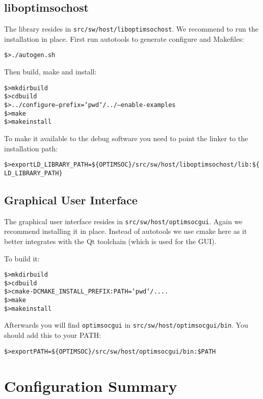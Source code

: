 \subsection{liboptimsochost}

The library resides in \verb|src/sw/host/liboptimsochost|. We
recommend to run the installation in place. First run autotools to
generate configure and Makefiles:

\begin{alltt}
\$> ./autogen.sh
\end{alltt}

Then build, make and install:

\begin{alltt}
\$> mkdir build
\$> cd build
\$> ../configure --prefix=`pwd`/../ --enable-examples
\$> make
\$> make install
\end{alltt}

To make it available to the debug software you need to point the
linker to the installation path:

\begin{alltt}
\$> export LD_LIBRARY_PATH=\$\{OPTIMSOC\}/src/sw/host/liboptimsochost/lib:\$\{LD_LIBRARY_PATH\}
\end{alltt}

\subsection{Graphical User Interface}

The graphical user interface resides in
\verb|src/sw/host/optimsocgui|. Again we recommend installing it in
place. Instead of autotools we use cmake here as it better integrates
with the Qt toolchain (which is used for the GUI).

To build it:

\begin{alltt}
\$> mkdir build
\$> cd build
\$> cmake -DCMAKE_INSTALL_PREFIX:PATH=`pwd`/.. ..
\$> make
\$> make install
\end{alltt}

Afterwards you will find \verb|optimsocgui| in
\verb|src/sw/host/optimsocgui/bin|. You should add this to your PATH:

\begin{alltt}
\$> export PATH=\$\{OPTIMSOC\}/src/sw/host/optimsocgui/bin:\$PATH
\end{alltt}

\section{Configuration Summary}

